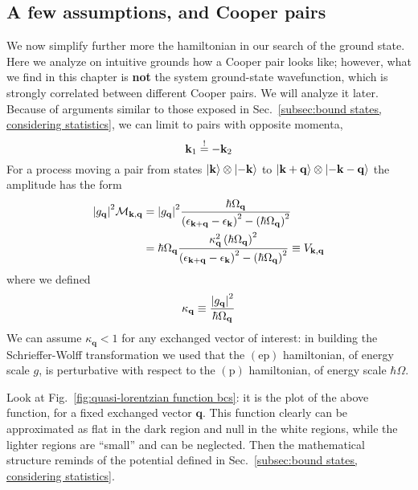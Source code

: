\subsection{A few assumptions, and Cooper pairs}\label{subsec:a few assumptions, and cooper pairs}

We now simplify further more the hamiltonian in our search of the ground state. Here we analyze on intuitive grounds how a Cooper pair looks like; however, what we find in this chapter is \textbf{not} the system ground-state wavefunction, which is strongly correlated between different Cooper pairs. We will analyze it later.
Because of arguments similar to those exposed in Sec.~\ref{subsec:bound states, considering statistics}, we can limit to pairs with opposite momenta,
\[
	\mathbf{k}_1 \stackrel{!}{=} - \mathbf{k}_2
\]
For a process moving a pair from states $\ket{\mathbf{k}}\otimes\ket{-\mathbf{k}}$ to $\ket{\mathbf{k}+\mathbf{q}}\otimes\ket{-\mathbf{k}-\mathbf{q}}$ the amplitude has the form
\[
\begin{aligned}
	\abs{g_\mathbf{q}}^2 \mathcal{M}_{\mathbf{k},\mathbf{q}} &= \abs{g_\mathbf{q}}^2 \frac{
		\hbar\Omega_\mathbf{q}
	}{
		\left({\epsilon_{\mathbf{k}+\mathbf{q}} - \epsilon_\mathbf{k}}\right)^2 - \left({\hbar\Omega_\mathbf{q}}\right)^2
	} \\
	&= \hbar\Omega_\mathbf{q} \frac{
		\kappa_\mathbf{q}^2 \left({\hbar\Omega_\mathbf{q}}\right)^2
	}{
		\left({\epsilon_{\mathbf{k}+\mathbf{q}} - \epsilon_\mathbf{k}}\right)^2 - \left({\hbar\Omega_\mathbf{q}}\right)^2
	}
	\equiv V_{\mathbf{k},\mathbf{q}}
\end{aligned}
\]
where we defined
\[
	\kappa_\mathbf{q} \equiv \frac{\abs{g_\mathbf{q}}^2}{\hbar\Omega_\mathbf{q}}
\]
We can assume $\kappa_\mathbf{q} < 1$ for any exchanged vector of interest: in building the Schrieffer-Wolff transformation we used that the $(\mathrm{ep})$ hamiltonian, of energy scale $g$, is perturbative with respect to the $(\mathrm{p})$ hamiltonian, of energy scale $\hbar\Omega$.

Look at Fig.~\ref{fig:quasi-lorentzian function bcs}: it is the plot of the above function, for a fixed exchanged vector $\mathbf{q}$.
This function clearly can be approximated as flat in the dark region and null in the white regions, while the lighter regions are ``small'' and can be neglected. Then the mathematical structure reminds of the potential defined in Sec.~\ref{subsec:bound states, considering statistics}.


